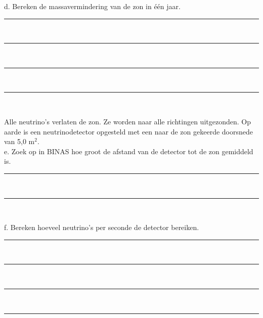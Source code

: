 d. Bereken de massavermindering van de zon in één jaar.
\begin{center}
    \rule{\textwidth}{0.3mm}\\
    \rule{\textwidth}{0.3mm}\\
    \rule{\textwidth}{0.3mm}\\
    \rule{\textwidth}{0.3mm}\\
\end{center}
Alle neutrino's verlaten de zon. Ze worden naar alle richtingen uitgezonden. 
Op aarde is een neutrinodetector opgesteld met een naar de zon gekeerde 
doorsnede van 5,0 m$^{2}$.\\
e. Zoek op in BINAS hoe groot de afstand van de detector tot de zon gemiddeld 
is. \\
\begin{center}
    \rule{\textwidth}{0.3mm}\\
    \rule{\textwidth}{0.3mm}\\
\end{center}
f. Bereken hoeveel neutrino's per seconde de detector bereiken.
\begin{center}
    \rule{\textwidth}{0.3mm}\\
    \rule{\textwidth}{0.3mm}\\
    \rule{\textwidth}{0.3mm}\\
    \rule{\textwidth}{0.3mm}\\
\end{center}
\bigskip{}


